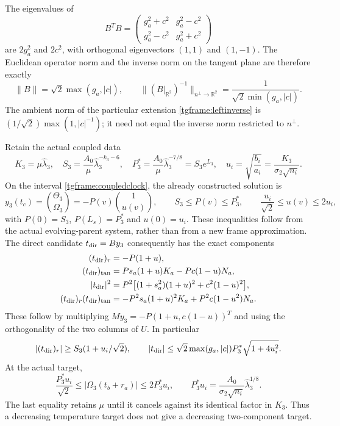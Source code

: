 \documentclass[11pt]{article}
\begin{document}
The eigenvalues of
\[
 B^TB=
 \begin{pmatrix}g_a^2+c^2&g_a^2-c^2\\
                 g_a^2-c^2&g_a^2+c^2\end{pmatrix}
\]
are $2g_a^2$ and $2c^2$, with orthogonal eigenvectors $(1,1)$
and $(1,-1)$. The Euclidean operator norm and the inverse norm on
the tangent plane are therefore exactly
\begin{equation}\label{tgframe:framenorms}
 \|B\|=\sqrt2\max(g_a,|c|),\qquad
 \|(B|_{\mathbb R^2})^{-1}\|_{n^\perp\to\mathbb R^2}
       =\frac1{\sqrt2\min(g_a,|c|)}.
\end{equation}
The ambient norm of the particular extension \eqref{tgframe:leftinverse}
is $(1/\sqrt2)\max(1,|c|^{-1})$; it need not equal the inverse norm
restricted to $n^\perp$.

Retain the actual coupled data
\[
 K_3=\mu\widehat\lambda_3,\quad
 S_3=\frac{A_0}{\mu}\widehat\lambda_3^{-k_3-6},\quad
 P_3^*=\frac{A_0}{\mu}\widehat\lambda_3^{-7/8}=S_3e^{L_3},
 \quad u_i=\sqrt{\frac{b_i}{a_i}}
           =\frac{K_3}{\sigma_2\sqrt{n_i}}.
\]
On the interval \eqref{tgframe:coupledclock}, the already constructed
solution is
\[
 y_3(t_c)=\binom{\Theta_3}{\Omega_3}
        =-P(v)\binom{1}{u(v)},\qquad
 S_3\le P(v)\le P_3^*,\qquad
 \frac{u_i}{\sqrt2}\le u(v)\le2u_i,
\]
with $P(0)=S_3$, $P(L_s)=P_3^*$ and $u(0)=u_i$.
These inequalities follow from the actual evolving-parent system,
rather than from a new frame approximation.
The direct candidate $t_{\rm dir}=By_3$ consequently has the exact
components
\begin{align}
 (t_{\rm dir})_r&=-P(1+u),\nonumber\\
 (t_{\rm dir})_{\tan}
       &=P s_a(1+u)K_a-Pc(1-u)N_a,\label{tgframe:directcomponents}\\
 |t_{\rm dir}|^2
       &=P^2\bigl[(1+s_a^2)(1+u)^2+c^2(1-u)^2\bigr],\nonumber\\
 (t_{\rm dir})_r(t_{\rm dir})_{\tan}
       &=-P^2s_a(1+u)^2K_a+P^2c(1-u^2)N_a.\nonumber
\end{align}
These follow by multiplying $My_3=-P(1+u,c(1-u))^T$ and using
the orthogonality of the two columns of $U$. In particular
\[
 |(t_{\rm dir})_r|\ge S_3(1+u_i/\sqrt2),\qquad
 |t_{\rm dir}|\le\sqrt2\max(g_a,|c|)P_3^*\sqrt{1+4u_i^2}.
\]
At the actual target,
\begin{equation}\label{tgframe:endpointomega}
 \frac{P_3^*u_i}{\sqrt2}\le|\Omega_3(t_b+r_a)|
                      \le2P_3^*u_i,\qquad
 P_3^*u_i=\frac{A_0}{\sigma_2\sqrt{n_i}}
                          \widehat\lambda_3^{1/8}.
\end{equation}
The last equality retains $\mu$ until it cancels against its identical
factor in $K_3$. Thus a decreasing temperature target does not give a
decreasing two-component target.
\end{document}
